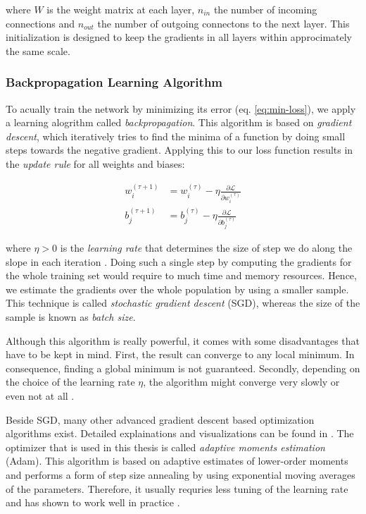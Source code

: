 where $ W $ is the weight matrix at each layer, $ n_{in} $ the number of incoming connections and $ n_{out} $ the number of outgoing connectons to the next layer. This initialization is designed to keep the gradients in all layers within approcimately the same scale.

\subsubsection{Backpropagation Learning Algorithm}

To acually train the network by minimizing its error (eq. \ref{eq:min-loss}), we apply a learning alogrithm called \textit{backpropagation}. This algorithm is based on \textit{gradient descent}, which iteratively tries to find the minima of a function by doing small steps towards the negative gradient. Applying this to our loss function results in the \textit{update rule} for all weights and biases:

\begin{equation} \label{eq:gradient_descent}
\begin{aligned}
w_{i}^{(\tau + 1)} &= w_{i}^{(\tau)} - \eta \frac{\partial \mathcal{L}}{\partial w_{i}^{(\tau)}} \\
b_{j}^{(\tau + 1)} &= b_{j}^{(\tau)} - \eta \frac{\partial \mathcal{L}}{\partial b_{j}^{(\tau)}}
\end{aligned}
\end{equation}

where $ \eta > 0 $ is the \textit{learning rate} that determines the size of step we do along the slope in each iteration \parencite{pattern_and_ml}. Doing such a single step by computing the gradients for the whole training set would require to much time and memory resources. Hence, we estimate the gradients over the whole population by using a smaller sample. This technique is called \textit{stochastic gradient descent} (SGD), whereas the size of the sample is known as \textit{batch size}.

Although this algorithm is really powerful, it comes with some disadvantages that have to be kept in mind. First, the result can converge to any local minimum. In consequence, finding a global minimum is not guaranteed. Secondly, depending on the choice of the learning rate $ \eta $, the algorithm might converge very slowly or even not at all \parencite{ann}.

Beside SGD, many other advanced gradient descent based optimization algorithms exist. Detailed explainations and visualizations can be found in \parencite{optimization}. The optimizer that is used in this thesis is called \textit{adaptive moments estimation} (Adam). This algorithm is based on adaptive estimates of lower-order moments and performs a form of step size annealing by using exponential moving averages of the parameters. Therefore, it usually requries less tuning of the learning rate and has shown to work well in practice \parencite{adam}.


